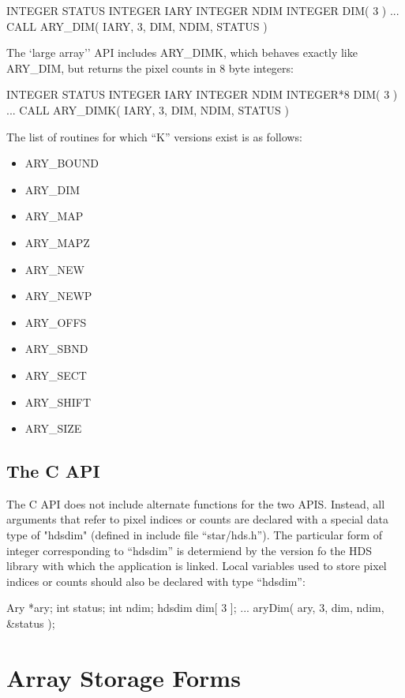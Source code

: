 \documentclass[twoside,11pt,nolof]{starlink}
\begin{document}
\begin{terminalv}
      INTEGER STATUS
      INTEGER IARY
      INTEGER NDIM
      INTEGER DIM( 3 )
      ...
      CALL ARY\_DIM( IARY, 3, DIM, NDIM, STATUS )
\end{terminalv}

The `large array'' API includes ARY\_DIMK, which behaves exactly like
ARY\_DIM, but returns the pixel counts in 8 byte integers:

\begin{terminalv}
      INTEGER STATUS
      INTEGER IARY
      INTEGER NDIM
      INTEGER*8 DIM( 3 )
      ...
      CALL ARY\_DIMK( IARY, 3, DIM, NDIM, STATUS )
\end{terminalv}

The list of routines for which ``K'' versions exist is as follows:
\begin{itemize}
\item ARY\_BOUND
\item ARY\_DIM
\item ARY\_MAP
\item ARY\_MAPZ
\item ARY\_NEW
\item ARY\_NEWP
\item ARY\_OFFS
\item ARY\_SBND
\item ARY\_SECT
\item ARY\_SHIFT
\item ARY\_SIZE
\end{itemize}

\subsection{The C API}
The C API does not include alternate functions for the two APIS. Instead,
all arguments that refer to pixel indices or counts are declared with a
special data type of "hdsdim" (defined in include file ``star/hds.h'').
The particular form of integer corresponding to ``hdsdim'' is determiend
by the version fo the HDS library with which the application is linked.
Local variables used to store pixel indices or counts should also be
declared with type ``hdsdim'':

\begin{terminalv}
      Ary *ary;
      int status;
      int ndim;
      hdsdim dim[ 3 ];
      ...
      aryDim( ary, 3, dim, ndim, &status );
\end{terminalv}


\section{Array Storage Forms}
\label{array_storage_forms}
\end{document}
